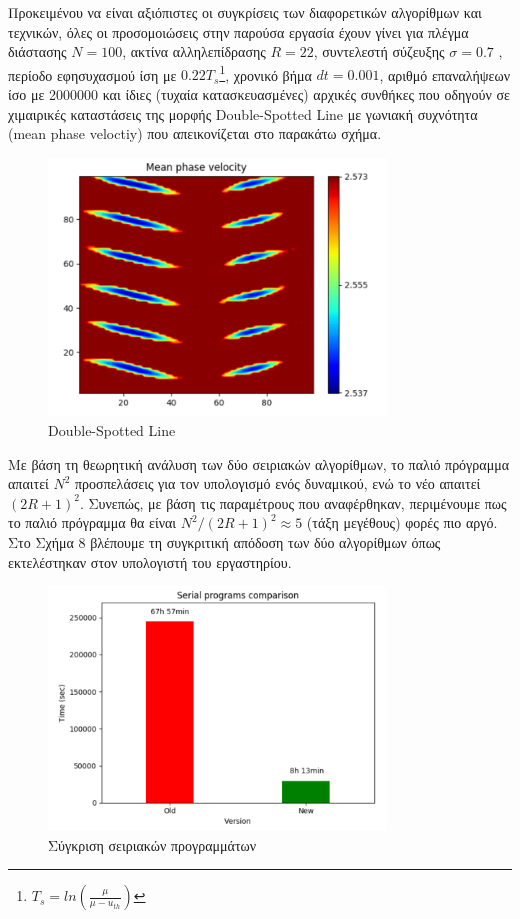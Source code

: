 \documentclass[12pt,a4paper]{article}
\begin{document}
Προκειμένου να είναι αξιόπιστες οι συγκρίσεις των διαφορετικών αλγορίθμων και τεχνικών, όλες οι προσομοιώσεις στην παρούσα εργασία έχουν γίνει για πλέγμα διάστασης $N=100$, ακτίνα αλληλεπίδρασης $R=22$, συντελεστή σύζευξης $\sigma=0.7$ , περίοδο εφησυχασμού ίση με $0.22T_s$\footnote{$T_s=ln(\frac{\mu}{\mu-u_{th}})$}, χρονικό βήμα $dt=0.001$, αριθμό επαναλήψεων ίσο με 2000000 και ίδιες (τυχαία κατασκευασμένες) αρχικές συνθήκες που οδηγούν σε χιμαιρικές καταστάσεις της μορφής Double-Spotted Line με γωνιακή συχνότητα (mean phase veloctiy) που απεικονίζεται στο παρακάτω σχήμα.

\begin{figure}[h!]
\centering
\includegraphics[width=0.8\textwidth]{Figures/mean_phase_velocity.png}
\caption{Double-Spotted Line}
\end{figure}

Με βάση τη θεωρητική ανάλυση των δύο σειριακών αλγορίθμων, το παλιό πρόγραμμα απαιτεί $N^2$ προσπελάσεις για τον υπολογισμό ενός δυναμικού, ενώ το νέο απαιτεί $(2R+1)^2$. Συνεπώς, με βάση τις παραμέτρους που αναφέρθηκαν, περιμένουμε πως το παλιό πρόγραμμα θα είναι $N^2/(2R+1)^2 \approx 5$ (τάξη μεγέθους) φορές πιο αργό. Στο Σχήμα 8 βλέπουμε τη συγκριτική απόδοση των δύο αλγορίθμων όπως εκτελέστηκαν στον υπολογιστή του εργαστηρίου.

\begin{figure}[h!]
\centering
\includegraphics[width=0.8\textwidth]{Figures/oldvsnew.png}
\caption{Σύγκριση σειριακών προγραμμάτων}
\end{figure}
 
\end{document}
